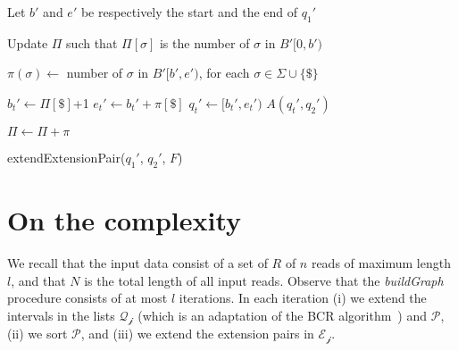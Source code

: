 \documentclass[runningheads,envcountsame,a4paper]{llncs}
\begin{document}
\begin{algorithm}
Let $b'$ and $e'$ be respectively the start and the end of $q_{1}'$\;

\tcp{$\Pi[\sigma]$ must be number of $\sigma$ in $B'[0,b')$, for each $\sigma \in \Sigma \cup \{\$\}$}
Update $\Pi$ such that $\Pi[\sigma]$ is the number of $\sigma$ in $B'[0, b')$\;

$\pi(\sigma) \gets$ number of $\sigma$ in $B'[b',e')$, for each $\sigma \in \Sigma \cup \{\$\}$\;

 {
      $b_{t}' \gets \Pi[ \$ ]$+1\;
      $e_{t}' \gets b_{t}' + \pi[ \$ ]$\;
      $q_{t}' \gets [b_{t}',e_{t}')$\;
      \Return $A(q_{t}', q_{2}')$\;
  }
\Else {
 \ForEach{$\sigma \in \Sigma$}{
    $b'_e \gets C[ \sigma ] + \Pi[ \sigma ]+1$\;
    $e'_e \gets b'_e + \pi[ \sigma ]$\;
      $q_{e}' \gets [b_{e}',e_{e}')$\;
    Append $(q_{t}', q_{2}')$ to $F(\sigma)$\;
      \Return an empty arc set\;

  }
}

$\Pi \gets \Pi + \pi$

\caption{extendExtensionPair($q_{1}'$, $q_{2}'$, $F$)}
\label{alg:processExtPair}
\end{algorithm}

\section{On the complexity}





We recall that the input data consist of a set of  $R$ of $n$ reads of maximum
length $l$, and that $N$ is the total length of all input reads.
Observe that the \emph{buildGraph} procedure consists of  at most $l$ iterations.
In each iteration (i) we extend the intervals in the lists $\mathcal{Q_{j}}$ (which is an
adaptation of the BCR algorithm~\cite{Bauer2013}) and $\mathcal P$, (ii) we sort
$\mathcal P$, and (iii) we extend the extension pairs in $\mathcal{E_{j}}$.
\end{document}
